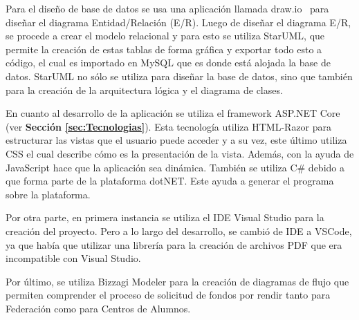 Para el diseño de base de datos se usa una aplicación llamada draw.io~\cite{20} para diseñar el diagrama Entidad/Relación (E/R). Luego de diseñar el diagrama E/R, se procede a crear el modelo relacional y para esto se utiliza StarUML, que permite la creación de estas tablas de forma gráfica y exportar todo esto a código, el cual es importado en MySQL que es donde está alojada la base de datos. StarUML no sólo se utiliza para diseñar la base de datos, sino que también para la creación de la arquitectura lógica y el diagrama de clases. 

En cuanto al desarrollo de la aplicación se utiliza el framework ASP.NET Core (ver \textbf{Sección \ref{sec:Tecnologias}}). Esta tecnología utiliza HTML-Razor para estructurar las vistas que el usuario puede acceder y a su vez, este último utiliza CSS el cual describe cómo es la presentación de la vista. Además, con la ayuda de JavaScript hace que la aplicación sea dinámica. También se utiliza C\# debido a que forma parte de la plataforma dotNET. Este ayuda a generar el programa sobre la plataforma. 

 Por otra parte, en primera instancia se utiliza el IDE Visual Studio para la creación del proyecto. Pero a lo largo del desarrollo, se cambió de IDE a VSCode, ya que había que utilizar una librería para la creación de archivos PDF que era incompatible con Visual Studio.

Por último, se utiliza Bizzagi Modeler para la creación de diagramas de flujo que permiten comprender el proceso de solicitud de fondos por rendir tanto para Federación como para Centros de Alumnos.